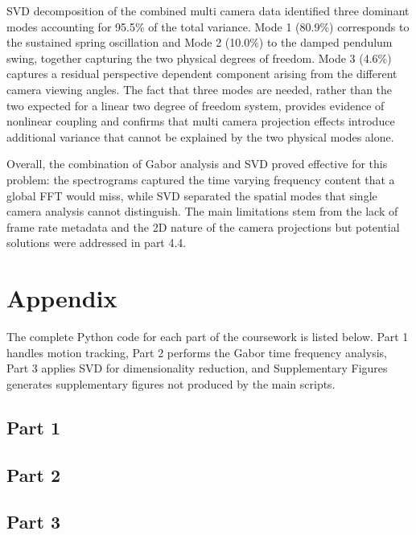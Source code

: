 \documentclass[12pt,a4paper]{article}
\begin{document}
SVD decomposition of the combined multi camera data identified three dominant modes accounting for 95.5\% of the total variance. Mode 1 (80.9\%) corresponds to the sustained spring oscillation and Mode 2 (10.0\%) to the damped pendulum swing, together capturing the two physical degrees of freedom. Mode 3 (4.6\%) captures a residual perspective dependent component arising from the different camera viewing angles. The fact that three modes are needed, rather than the two expected for a linear two degree of freedom system, provides evidence of nonlinear coupling and confirms that multi camera projection effects introduce additional variance that cannot be explained by the two physical modes alone.

Overall, the combination of Gabor analysis and SVD proved effective for this problem: the spectrograms captured the time varying frequency content that a global FFT would miss, while SVD separated the spatial modes that single camera analysis cannot distinguish. The main limitations stem from the lack of frame rate metadata and the 2D nature of the camera projections but potential solutions were addressed in part 4.4.

\newpage
\section{Appendix}

The complete Python code for each part of the coursework is listed below. Part 1 handles motion tracking, Part 2 performs the Gabor time frequency analysis, Part 3 applies SVD for dimensionality reduction, and Supplementary Figures generates supplementary figures not produced by the main scripts.
\subsection{Part 1}


\newpage
\subsection{Part 2}


\newpage
\subsection{Part 3}

\end{document}
